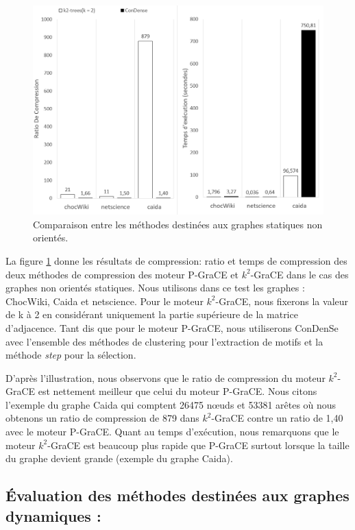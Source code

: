 	\begin{figure}[H]
	\centering
	\includegraphics[scale=0.65]{ressources/image/vogk2.png}
	\caption{Comparaison entre les méthodes destinées aux graphes statiques non orientés.}
	\label{fig:K2-vog}
\end{figure}	

	La figure \ref{fig:K2-vog}  donne les résultats de compression: ratio et temps de compression des deux méthodes de compression des moteur P-GraCE et $k^2$-GraCE dans le cas des graphes non orientés statiques. Nous utilisons dans ce test les graphes : ChocWiki, Caida et netscience. Pour le moteur $k^2$-GraCE, nous fixerons la valeur de k à 2 en considérant uniquement la partie supérieure de la matrice d'adjacence. Tant dis que pour le moteur P-GraCE, nous utiliserons \gls{ConDenSe} avec l'ensemble des méthodes de clustering pour l'extraction de motifs et la méthode \textit{step} pour la sélection.
	
	D'après l'illustration, nous observons que le ratio de compression du moteur $k^2$-GraCE  est nettement meilleur que celui du moteur P-GraCE. Nous citons l'exemple du graphe Caida qui comptent 26475 nœuds et 53381 arêtes où nous obtenons un ratio de compression de 879 dans $k^2$-GraCE contre un ratio de 1,40 avec le moteur P-GraCE. Quant au temps d'exécution, nous remarquons que le moteur $k^2$-GraCE est beaucoup plus rapide que P-GraCE surtout lorsque la taille du graphe devient grande (exemple du graphe Caida).
 
	
	\subsection{Évaluation des méthodes destinées aux graphes dynamiques :}
	
